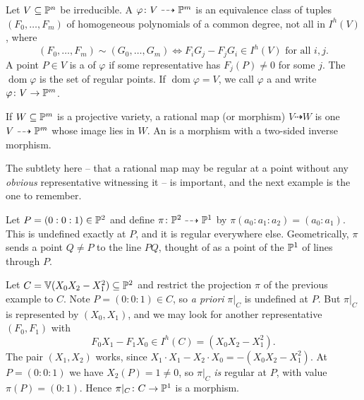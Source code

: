 \documentclass[a4paper]{scrartcl}
\newcommand{\V}{\mathbb{V}}
\newcommand{\dto}{\dashrightarrow}
\DeclareMathOperator{\dom}{dom}
\begin{document}
\begin{definition}
	Let $V \subseteq \mathbb{P}^n$ be irreducible. A  $\varphi \colon V \dto \PP^m$ is an equivalence class of tuples $(F_0,\dots,F_m)$ of homogeneous polynomials of a common degree, not all in $I^h(V)$, where
	$$(F_0,\dots,F_m) \sim (G_0,\dots,G_m) \iff F_iG_j - F_jG_i \in I^h(V) \text{ for all } i,j.$$
	A point $P \in V$ is a  of $\varphi$ if some representative has $F_j(P) \neq 0$ for some $j$. The  $\dom\varphi$ is the set of regular points. If $\dom\varphi = V$, we call $\varphi$ a  and write $\varphi \colon V \to \mathbb{P}^m$.
\end{definition}

If $W \subseteq \mathbb{P}^m$ is a projective variety, a rational map (or morphism) $V \dto W$ is one $V \dto \PP^m$ whose image lies in $W$. An  is a morphism with a two-sided inverse morphism.

The subtlety here -- that a rational map may be regular at a point without any \emph{obvious} representative witnessing it -- is important, and the next example is the one to remember.

\begin{example}\label{ex:projpoint}
	Let $P = (0:0:1) \in \mathbb{P}^2$ and define $\pi \colon \PP^2 \dto \PP^1$ by $\pi(a_0:a_1:a_2) = (a_0:a_1)$. This is undefined exactly at $P$, and it is regular everywhere else. Geometrically, $\pi$ sends a point $Q \neq P$ to the line $PQ$, thought of as a point of the $\mathbb{P}^1$ of lines through $P$.
\end{example}

\begin{example}\label{ex:conicP1}
	Let $C = \V(X_0X_2 - X_1^2) \subseteq \PP^2$ and restrict the projection $\pi$ of the previous example to $C$. Note $P = (0:0:1) \in C$, so \emph{a priori} $\pi|_C$ is undefined at $P$. But $\pi|_C$ is represented by $(X_0,X_1)$, and we may look for another representative $(F_0,F_1)$ with
	$$F_0X_1 - F_1X_0 \in I^h(C) = (X_0X_2 - X_1^2).$$
	The pair $(X_1,X_2)$ works, since $X_1 \cdot X_1 - X_2 \cdot X_0 = -(X_0X_2-X_1^2)$. At $P = (0:0:1)$ we have $X_2(P) = 1 \neq 0$, so $\pi|_C$ \emph{is} regular at $P$, with value $\pi(P) = (0:1)$. Hence $\pi|_C \colon C \to \mathbb{P}^1$ is a morphism.
\end{example}

\begin{center}
\end{center}
\end{document}

